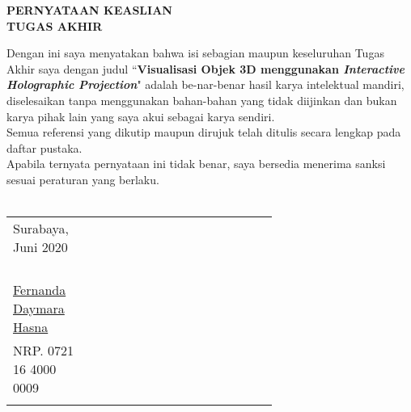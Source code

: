 \begin{center}
\Large\textbf{PERNYATAAN KEASLIAN\\}
\Large\textbf{TUGAS AKHIR}
\end{center}
\vspace{1ex}

\setlength{\parindent}{1cm} Dengan ini saya menyatakan bahwa isi sebagian maupun keseluruhan Tugas Akhir saya dengan judul ``\textbf{Visualisasi Objek 3D menggunakan \textit{Interactive Holographic Projection}}" adalah be-nar-benar hasil karya intelektual mandiri, diselesaikan tanpa menggunakan bahan-bahan yang tidak diijinkan dan bukan karya pihak lain yang saya akui sebagai karya sendiri.
\\

\setlength{\parindent}{1cm} Semua referensi yang dikutip maupun dirujuk telah ditulis secara lengkap pada daftar pustaka. 
\\

\setlength{\parindent}{1cm} Apabila ternyata pernyataan ini tidak benar, saya bersedia menerima sanksi sesuai peraturan yang berlaku.
\\
\\

\begin{adjustwidth}{6cm}{}
\begin{tabular}{lcp{0.65\linewidth}}
	\centering Surabaya, Juni 2020
	 & & \\
	\\
	\\
	\\
	\\
	\centering \underline{Fernanda Daymara Hasna} & & \\
	\centering NRP. 0721 16 4000 0009 & & \\ & & \\
	\end{tabular}
\end{adjustwidth}
